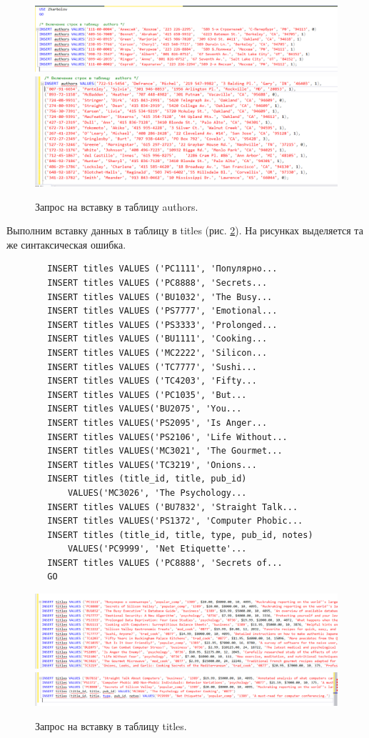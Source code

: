 \begin{figure}[h!]
    \centering
    \includegraphics[width=0.8\linewidth]{Pic/lab3/FQ1.PNG}
    \includegraphics[width=0.8\linewidth]{Pic/lab3/FQ2.PNG}
    \caption{Запрос на вставку в таблицу authors.}
    \label{fig:FQ12}
\end{figure}

Выполним вставку данных в таблицу в titles (рис. \ref{fig:TQ12}). На рисунках выделяется та же синтаксическая ошибка. 

\begin{verbatim}
        INSERT titles VALUES ('PC1111', 'Популярно...
        INSERT titles VALUES ('PC8888', 'Secrets...
        INSERT titles VALUES ('BU1032', 'The Busy...
        INSERT titles VALUES ('PS7777', 'Emotional...
        INSERT titles VALUES ('PS3333', 'Prolonged...
        INSERT titles VALUES ('BU1111', 'Cooking...
        INSERT titles VALUES ('MC2222', 'Silicon...
        INSERT titles VALUES ('TC7777', 'Sushi...
        INSERT titles VALUES ('TC4203', 'Fifty...
        INSERT titles VALUES ('PC1035', 'But...
        INSERT titles VALUES('BU2075', 'You...
        INSERT titles VALUES('PS2095', 'Is Anger...
        INSERT titles VALUES('PS2106', 'Life Without...
        INSERT titles VALUES('MC3021', 'The Gourmet...
        INSERT titles VALUES('TC3219', 'Onions...
        INSERT titles (title_id, title, pub_id) 
            VALUES('MC3026', 'The Psychology...
        INSERT titles VALUES ('BU7832', 'Straight Talk...
        INSERT titles VALUES('PS1372', 'Computer Phobic...
        INSERT titles (title_id, title, type, pub_id, notes) 
            VALUES('PC9999', 'Net Etiquette'...
        INSERT titles VALUES ('PC8888', 'Secrets of...
        GO
\end{verbatim}

\begin{figure}[h!]
    \centering
    \includegraphics[width=0.8\linewidth]{Pic/lab3/TQ1.PNG}
    \includegraphics[width=0.8\linewidth]{Pic/lab3/TQ2.PNG}
    \caption{Запрос на вставку в таблицу titles.}
    \label{fig:TQ12}
\end{figure}

